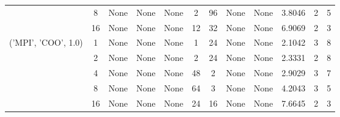 \begin{tabular}{cccccccccccc}
& 8& None& None& None& 2& 96& None& None& 3.8046& 2& 5\\
& 16& None& None& None& 12& 32& None& None& 6.9069& 2& 3\\
\hline
\multirow{5}{*}{('MPI', 'COO', 1.0)}& 1& None& None& None& 1& 24& None& None& 2.1042& 3& 8\\
& 2& None& None& None& 2& 24& None& None& 2.3331& 2& 8\\
& 4& None& None& None& 48& 2& None& None& 2.9029& 3& 7\\
& 8& None& None& None& 64& 3& None& None& 4.2043& 3& 5\\
& 16& None& None& None& 24& 16& None& None& 7.6645& 2& 3\\
\hline
\end{tabular}



